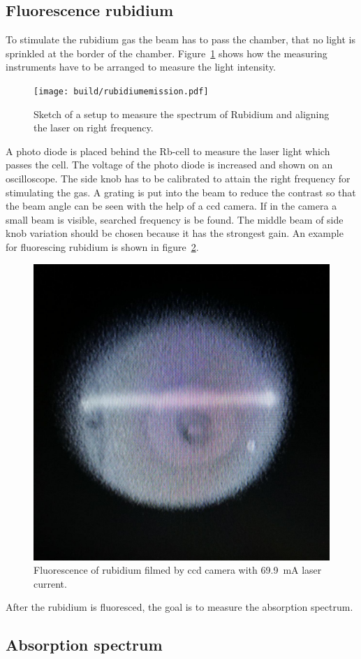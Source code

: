\subsection{Fluorescence rubidium}%
\label{sub:anregen_rubidium}

To stimulate the rubidium gas the beam has to pass the chamber, that no
light is sprinkled at the border of the chamber. 
Figure~\ref{fig:hole_emission} shows how the measuring instruments have to be
arranged to measure the light intensity.
\begin{figure}[h]
		\centering
		\texttt{[image: build/rubidiumemission.pdf]}
		\caption{Sketch of a setup to measure the spectrum of Rubidium and
		aligning the laser on right frequency.\cite{anleitung}}%
		\label{fig:hole_emission}
\end{figure}
A photo diode is placed behind the Rb-cell to measure the laser light which
passes the cell.
The voltage of the photo diode is increased and shown on an oscilloscope. 
The side knob has to be calibrated to attain the right frequency for stimulating
the gas. 
A grating is put into the beam to reduce the contrast so that the beam angle
can be seen with the help of a ccd camera. 
If in the camera a small beam is visible, searched frequency is be found. 
The middle beam of side knob variation should be chosen because it has the
strongest gain.
An example for fluorescing rubidium is shown in figure~\ref{fig:ionized}.
\begin{figure}[h]
		\centering
		\includegraphics[width=0.4\linewidth]{./content/pictures/fluorescence.jpg}
		\caption{Fluorescence of rubidium filmed by ccd camera with 
				\SI{69.9}{\milli\ampere} laser current.}%
		\label{fig:ionized}
\end{figure}
After the rubidium is fluoresced, the goal is to measure the absorption spectrum. 

\subsection{Absorption spectrum}%
\label{sub:absorbtion_spectrum}


